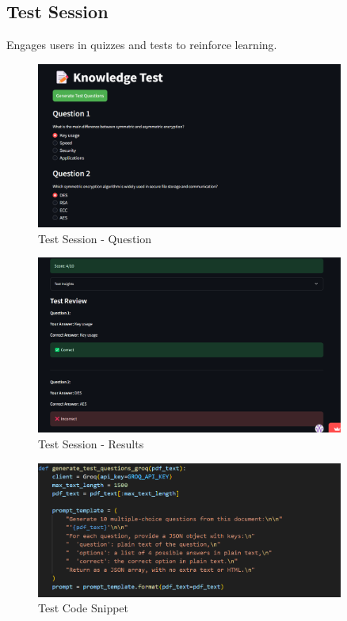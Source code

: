 \documentclass{report}
\begin{document}
\subsection{Test Session}
Engages users in quizzes and tests to reinforce learning.
\begin{figure}[H]
\centering
\includegraphics[width=0.9\textwidth]{test.png}
\caption{Test Session - Question}
\end{figure}
\begin{figure}[H]
\centering
\includegraphics[width=0.9\textwidth]{test-score-result.png}
\caption{Test Session - Results}
\end{figure}
\begin{figure}[H]
\centering
\includegraphics[width=0.9\textwidth]{test-code.png}
\caption{Test Code Snippet}
\end{figure}
\end{document}
